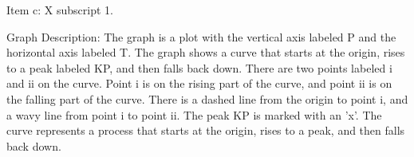 Item c: X subscript 1.

Graph Description:
The graph is a plot with the vertical axis labeled P and the horizontal axis labeled T. The graph shows a curve that starts at the origin, rises to a peak labeled KP, and then falls back down. There are two points labeled i and ii on the curve. Point i is on the rising part of the curve, and point ii is on the falling part of the curve. There is a dashed line from the origin to point i, and a wavy line from point i to point ii. The peak KP is marked with an 'x'. The curve represents a process that starts at the origin, rises to a peak, and then falls back down.